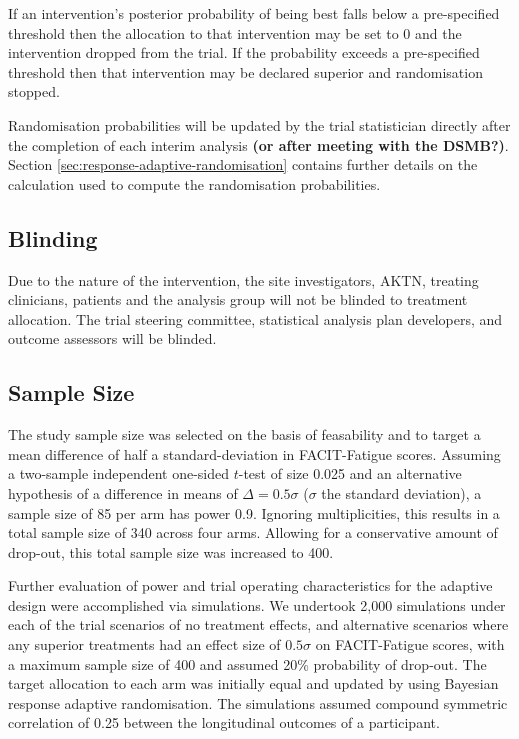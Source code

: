 \documentclass[11pt,parskip=half-]{scrartcl}
\begin{document}
If an intervention's posterior probability of being best falls below a pre-specified threshold then the allocation to that intervention may be set to 0 and the intervention dropped from the trial. If the probability exceeds a pre-specified threshold then that intervention may be declared superior and randomisation stopped.

Randomisation probabilities will be updated by the trial statistician directly after the completion of each interim analysis \textbf{(or after meeting with the DSMB?)}. Section \ref{sec:response-adaptive-randomisation} contains further details on the calculation used to compute the randomisation probabilities.

\subsection{Blinding}\label{blinding}

Due to the nature of the intervention, the site investigators, AKTN, treating clinicians, patients and the analysis group will not be blinded to treatment allocation. The trial steering committee, statistical analysis plan developers, and outcome assessors will be blinded.

\subsection{Sample Size}\label{sample-size}

The study sample size was selected on the basis of feasability and to target a mean difference of half a standard-deviation in FACIT-Fatigue scores. Assuming a two-sample independent one-sided $t$-test of size 0.025 and an alternative hypothesis of a difference in means of $\Delta=0.5\sigma$ ($\sigma$ the standard deviation), a sample size of 85 per arm has power 0.9. Ignoring multiplicities, this results in a total sample size of 340 across four arms. Allowing for a conservative amount of drop-out, this total sample size was increased to 400.

Further evaluation of power and trial operating characteristics for the adaptive design were accomplished via simulations. We undertook 2,000 simulations under each of the trial scenarios of no treatment effects, and alternative scenarios where any superior treatments had an effect size of $0.5\sigma$ on FACIT-Fatigue scores, with a maximum sample size of 400 and assumed 20\% probability of drop-out. The target allocation to each arm was initially equal and updated by using Bayesian response adaptive randomisation. The simulations assumed compound symmetric correlation of 0.25 between the longitudinal outcomes of a participant.
\end{document}
